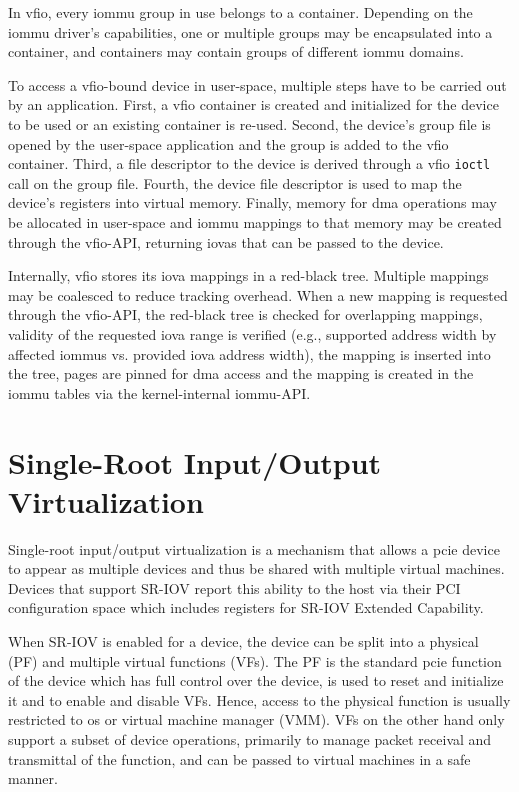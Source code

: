 In \ac{vfio}, every \ac{iommu} group in use belongs to a container. Depending on
the \ac{iommu} driver's capabilities, one or multiple groups may be encapsulated
into a container, and containers may contain groups of different \ac{iommu}
domains.

To access a \ac{vfio}-bound device in user-space, multiple steps have to be
carried out by an application. First, a \ac{vfio} container is created and
initialized for the device to be used or an existing container is re-used.
Second, the device's group file is opened by the user-space application and the
group is added to the \ac{vfio} container. Third, a file descriptor to the
device is derived through a \ac{vfio} \texttt{ioctl} call on the group file.
Fourth, the device file descriptor is used to map the device's registers into
virtual memory. Finally, memory for \ac{dma} operations may be allocated in
user-space and \ac{iommu} mappings to that memory may be created through the
\ac{vfio}-API, returning \acp{iova} that can be passed to the device.

Internally, \ac{vfio} stores its \ac{iova} mappings in a red-black tree.
Multiple mappings may be coalesced to reduce tracking overhead. When a new
mapping is requested through the \ac{vfio}-API, the red-black tree is checked
for overlapping mappings, validity of the requested \ac{iova} range is verified
(e.g., supported address width by affected \acp{iommu} vs. provided \ac{iova}
address width), the mapping is inserted into the tree, pages are pinned for
\ac{dma} access and the mapping is created in the \ac{iommu} tables via the
kernel-internal \ac{iommu}-API.


\section{Single-Root Input/Output Virtualization}
\label{sec:sriov}

Single-root input/output virtualization is a mechanism that allows a \ac{pcie}
device to appear as multiple devices and thus be shared with multiple virtual
machines. Devices that support SR-IOV report this ability to the host via their
PCI configuration space which includes registers for SR-IOV Extended Capability.

When SR-IOV is enabled for a device, the device can be split into a physical
(PF) and multiple virtual functions (VFs). The PF is the standard \ac{pcie}
function of the device which has full control over the device, is used to reset
and initialize it and to enable and disable VFs. Hence, access to the physical
function is usually restricted to \ac{os} or virtual machine manager (VMM). VFs
on the other hand only support a subset of device operations, primarily to
manage packet receival and transmittal of the function, and can be passed to
virtual machines in a safe manner.


